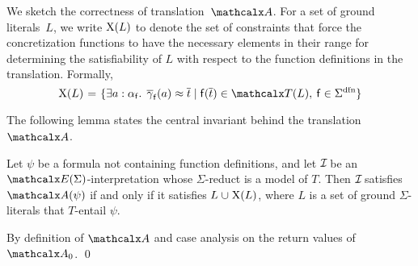 

We sketch the correctness of translation~$\conv$.
For a set of ground literals~$L$,
we write $\mathrm{X}( L )$ to denote the set of constraints that
force the concretization functions to have the necessary elements in their
range for determining the satisfiability of $L$ with respect to the function
definitions in the translation.
Formally,
\begin{equation} \label{eq:xl}
\absconstraints( L ) \vthinspace=\vthinspace \smash{\{ \exists a : {\fargtype{\con{f}}}.\;\, \vecfarg{\con{f}}( a ) \teq \nobreak \vec t
\nobreak\mid\allowbreak \con{f}( \vec t ) \in \terms( L ),\: \con{f} \in \sfundefs{\Sigma}
\}}
\end{equation}

The following lemma states the central invariant behind the translation $\conv$.

\begin{lemma}\label{lem:conv}
Let $\psi$ be a formula not containing function definitions,
and let $\mathcal{I\!}$ be an $\extendsig{\Sigma}$-interpretation whose $\Sigma$-reduct
is a model of $T$.
Then $\mathcal{I\!}$ satisfies $\conv( \psi )$ if and only if
it satisfies $L \cup \absconstraints( L )$, where $L$ is a set of ground $\Sigma$-literals that $T$-entail $\psi$.
\end{lemma}
\begin{proofsketch}
By definition of $\conv$ and case analysis on the return values of $\conv_0$.
\qed
\end{proofsketch}

